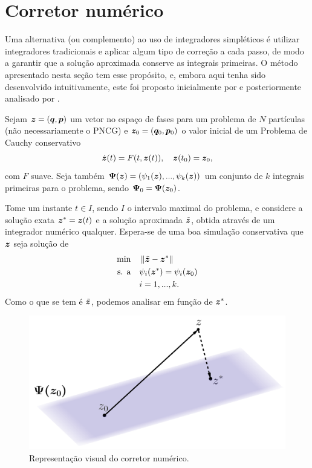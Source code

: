 \section{Corretor numérico}\label{secao:corretor_numerico}

Uma alternativa (ou complemento) ao uso de integradores simpléticos é utilizar integradores tradicionais e aplicar algum tipo de correção a cada passo, de modo a garantir que a solução aproximada conserve as integrais primeiras. O método apresentado nesta seção tem esse propósito, e, embora aqui tenha sido desenvolvido intuitivamente, este foi proposto inicialmente por \cite{Nacozy1972} e posteriormente analisado por \cite{Shampine1986}.

Sejam $\bm z = (\bm q, \bm p)$ um vetor no espaço de fases para um problema de $N$ partículas (não necessariamente o PNCG) e $\bm z_0 = (\bm q_0, \bm p_0)$ o valor inicial de um Problema de Cauchy conservativo
\begin{equation*}
    \dot {\bm z} (t) = F(t,\bm z(t)), \quad \bm z(t_0) = \bm z_0,
\end{equation*}
com $F$ suave. Seja também $\bm \Psi (\bm z) = (\psi_1(\bm z), ..., \psi_k(\bm z))$ um conjunto de $k$ integrais primeiras para o problema, sendo $\bm \Psi_0 = \bm \Psi(\bm z_0)$.

Tome um instante $t \in I$, sendo $I$ o intervalo maximal do problema, e considere a solução exata $\bm z^* = \bm z(t)$ e a solução aproximada $\tilde{\bm z}$, obtida através de um integrador numérico qualquer. Espera-se de uma boa simulação conservativa que $\bm z$ seja solução de
\begin{equation}\label{eq:problema_otimizacao_corretor}
    \begin{aligned}
        \min \quad & \left\Vert \tilde{\bm z} - \bm z^* \right\Vert \\
        \text{s. a} \quad & \psi_i (\bm z^*) = \psi_i (\bm z_0) \\
        &  i = 1, ..., k.
    \end{aligned}
\end{equation}
Como o que se tem é $\tilde{\bm z}$, podemos analisar em função de $\bm z^*$.

\begin{figure}
    \centering
    \includegraphics[width=0.5\linewidth]{tcc//img/corretor_visualizacao.png}
    \caption{Representação visual do corretor numérico.}
    \label{fig:corretor_visualizacao}
\end{figure}

